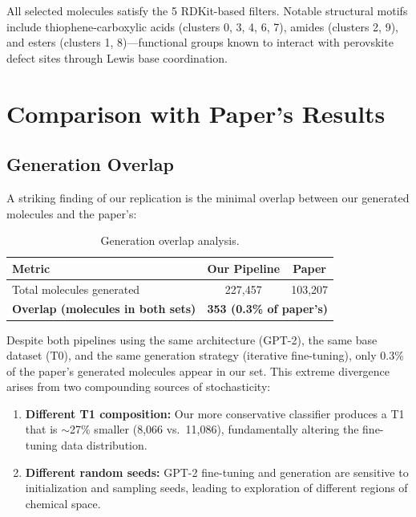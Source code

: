 \documentclass[11pt,a4paper]{article}
\begin{document}
All selected molecules satisfy the 5 RDKit-based filters. Notable structural motifs include thiophene-carboxylic acids (clusters 0, 3, 4, 6, 7), amides (clusters 2, 9), and esters (clusters 1, 8)---functional groups known to interact with perovskite defect sites through Lewis base coordination.

\section{Comparison with Paper's Results}
\label{sec:comparison}

\subsection{Generation Overlap}
\label{sec:gen_overlap}

A striking finding of our replication is the minimal overlap between our generated molecules and the paper's:

\begin{table}[H]
\centering
\caption{Generation overlap analysis.}
\label{tab:gen_overlap}
\begin{tabular}{lcc}
\toprule
Metric & Our Pipeline & Paper \\
\midrule
Total molecules generated & 227,457 & 103,207 \\
\textbf{Overlap (molecules in both sets)} & \multicolumn{2}{c}{\textbf{353 (0.3\% of paper's)}} \\
\bottomrule
\end{tabular}
\end{table}

Despite both pipelines using the same architecture (GPT-2), the same base dataset (T0), and the same generation strategy (iterative fine-tuning), only 0.3\% of the paper's generated molecules appear in our set. This extreme divergence arises from two compounding sources of stochasticity:
\begin{enumerate}[nosep]
    \item \textbf{Different T1 composition:} Our more conservative classifier produces a T1 that is $\sim$27\% smaller (8,066 vs.\ 11,086), fundamentally altering the fine-tuning data distribution.
    \item \textbf{Different random seeds:} GPT-2 fine-tuning and generation are sensitive to initialization and sampling seeds, leading to exploration of different regions of chemical space.
\end{enumerate}
\end{document}

